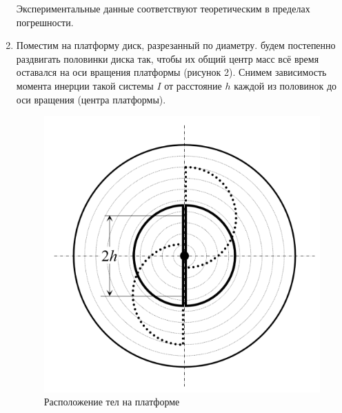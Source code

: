 \documentclass[a4paper,12pt]{article}
\begin{document}
\begin{enumerate}
    Экспериментальные данные соответствуют теоретическим в пределах погрешности.
    \item Поместим на платформу диск, разрезанный по диаметру. будем постепенно раздвигать половинки диска так, чтобы их общий центр масс всё время оставался на оси вращения платформы (рисунок 2). Снимем зависимость момента инерции такой системы $I$ от расстояние $h$ каждой из половинок до оси вращения (центра платформы).
    \begin{figure}[H]
        \centering
        \includegraphics[scale = 0.3]{h.png}
        \caption{Расположение тел на платформе}
    \end{figure}


\end{enumerate}
\end{document}
